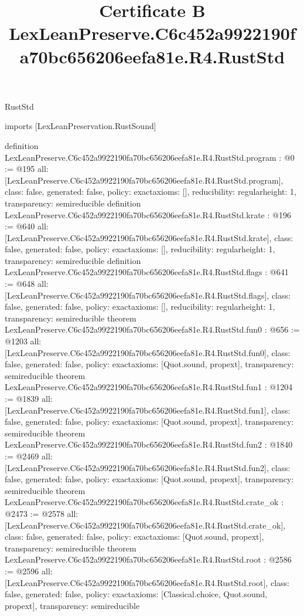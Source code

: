 \begin{lexlean}{RustStd}
\title{Certificate B LexLeanPreserve.C6c452a9922190fa70bc656206eefa81e.R4.RustStd}
\begin{coremodule}
imports [LexLeanPreservation.RustSound]

definition LexLeanPreserve.C6c452a9922190fa70bc656206eefa81e.R4.RustStd.program : @0 := @195 {
  all: [LexLeanPreserve.C6c452a9922190fa70bc656206eefa81e.R4.RustStd.program],
  class: false,
  generated: false,
  policy: exact{axioms: []},
  reducibility: regular{height: 1},
  transparency: semireducible
}
definition LexLeanPreserve.C6c452a9922190fa70bc656206eefa81e.R4.RustStd.krate : @196 := @640 {
  all: [LexLeanPreserve.C6c452a9922190fa70bc656206eefa81e.R4.RustStd.krate],
  class: false,
  generated: false,
  policy: exact{axioms: []},
  reducibility: regular{height: 1},
  transparency: semireducible
}
definition LexLeanPreserve.C6c452a9922190fa70bc656206eefa81e.R4.RustStd.flags : @641 := @648 {
  all: [LexLeanPreserve.C6c452a9922190fa70bc656206eefa81e.R4.RustStd.flags],
  class: false,
  generated: false,
  policy: exact{axioms: []},
  reducibility: regular{height: 1},
  transparency: semireducible
}
theorem LexLeanPreserve.C6c452a9922190fa70bc656206eefa81e.R4.RustStd.fun0 : @656 := @1203 {
  all: [LexLeanPreserve.C6c452a9922190fa70bc656206eefa81e.R4.RustStd.fun0],
  class: false,
  generated: false,
  policy: exact{axioms: [Quot.sound, propext]},
  transparency: semireducible
}
theorem LexLeanPreserve.C6c452a9922190fa70bc656206eefa81e.R4.RustStd.fun1 : @1204 := @1839 {
  all: [LexLeanPreserve.C6c452a9922190fa70bc656206eefa81e.R4.RustStd.fun1],
  class: false,
  generated: false,
  policy: exact{axioms: [Quot.sound, propext]},
  transparency: semireducible
}
theorem LexLeanPreserve.C6c452a9922190fa70bc656206eefa81e.R4.RustStd.fun2 : @1840 := @2469 {
  all: [LexLeanPreserve.C6c452a9922190fa70bc656206eefa81e.R4.RustStd.fun2],
  class: false,
  generated: false,
  policy: exact{axioms: [Quot.sound, propext]},
  transparency: semireducible
}
theorem LexLeanPreserve.C6c452a9922190fa70bc656206eefa81e.R4.RustStd.crate_ok : @2473 := @2578 {
  all: [LexLeanPreserve.C6c452a9922190fa70bc656206eefa81e.R4.RustStd.crate_ok],
  class: false,
  generated: false,
  policy: exact{axioms: [Quot.sound, propext]},
  transparency: semireducible
}
theorem LexLeanPreserve.C6c452a9922190fa70bc656206eefa81e.R4.RustStd.root : @2586 := @2596 {
  all: [LexLeanPreserve.C6c452a9922190fa70bc656206eefa81e.R4.RustStd.root],
  class: false,
  generated: false,
  policy: exact{axioms: [Classical.choice, Quot.sound, propext]},
  transparency: semireducible
}


\end{coremodule}
\end{lexlean}
